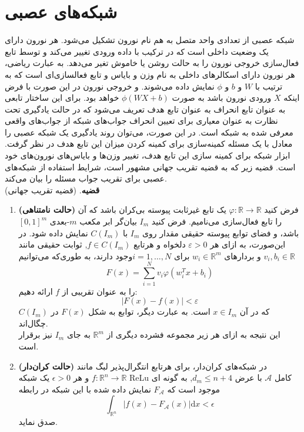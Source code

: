 \section*{شبکه‌های عصبی }
شبکه عصبی از تعدادی واحد متصل به هم نام نورون  تشکیل می‌شود. هر نورون دارای یک وضعیت داخلی است که در ترکیب با داده ورودی تغییر می‌کند و توسط تابع فعال‌سازی خروجی نورون را به حالت روشن یا خاموش تغیر می‌دهد. به عبارت ریاضی، هر نورون دارای اسکالرهای داخلی به نام وزن و بایاس و تابع فعالسازی‌ای است که به ترتیب با $W$ و $b$ و $\phi$ نمایش داده می‌شوند. و خروجی نورون در این صورت با فرض اینکه $X$ ورودی نورون باشد به صورت $\phi(WX + b)$ خواهد بود. برای این ساختار تابعی به عنوان تابع انحراف به عنوان تابع هدف تعریف می‌شود که در حالت یادگیری تحت نظارت به عنوان معیاری برای تعیین انحراف جواب‌های شبکه از جواب‌های واقعی معرفی شده به شبکه است. در این صورت، می‌توان روند یادگیری یک شبکه عصبی را معادل با یک مسئله کمینه‌سازی برای کمینه کردن میزان این تابع هدف در نظر گرفت. ابزار شبکه برای کمینه سازی این تابع هدف، تغییر وزن‌ها و بایاس‌های نورون‌های خود است. قضیه زیر که به قضیه تقریب جهانی مشهور است، شرایط استفاده از شبکه‌های عصبی برای تقریب جواب مسئله را بیان می‌کند.\\
\textbf{قضیه}. (قضیه تقریب جهانی) 
	\begin{enumerate}
	\item \textbf{(حالت نامتناهی)} فرض کنید $\varphi :\mathbb {R} \to \mathbb {R}$ یک تابع غیرثابت پیوسته بی‌کران باشد که آن را تابع فعال‌سازی می‌نامیم. فرض کنید $I_{m}$ بیان‌گر ابر مکعب $m$-بعدی $[0,1]^{m}$ باشد، و فضای توابع پیوسته حقیقی مقدار روی $I_m$ با $C(I_{m})$ نمایش داده شود. در این‌صورت، به ازای هر $\varepsilon > 0$ دلخواه و هرتابع  $f\in C(I_{m})$, ثوابت حقیقی مانند  $v_{i},b_{i}\in \mathbb  {R}$ و بردارهای $w_{i}\in \mathbb {R} ^{m}$ برای $i=1,\dots ,N$وجود دارند، به طوری‌که می‌توانیم  	
	\begin{equation*}
	F(x)=\sum _{{i=1}}^{{N}}v_{i}\varphi \left(w_{i}^{T}x+b_{i}\right)
	\end{equation*}
	را به عنوان تقریبی از $f$ ارائه دهیم:
	\begin{equation*}
	|F(x) - f (x)|  < \varepsilon
	\end{equation*}
	که در آن $x\in I_{m}$ است. به عبارت دیگر، توابع به شکل $F(x)$ در $C(I_{m})$ چگال‌اند.\\
	این نتیجه به ازای هر زیر مجموعه فشرده دیگری از $\mathbb {R} ^{m}$ به جای  $I_m$ نیز برقرار است.
	\item \textbf{(حالت کران‌دار)} در شبکه‌های کران‌دار، برای هرتابع انتگرال‌پذیر لبگ مانند  $f:\mathbb {R} ^{n}\rightarrow \mathbb {R}$ و هر $\epsilon >0$ یک شبکه ReLu کامل $\mathcal {A}$ با عرض $ d_{m}\leq {n+4}$, به گونه ای موجود است که $F_{\mathcal {A}}$ نمایش داده شده با این شبکه در رابطه
	\begin{equation*}
	\int _{\mathbb {R} ^{n}}\left|f(x)-F_{\mathcal {A}}(x)\right|\mathrm {d} x<\epsilon
	\end{equation*}
	صدق ‌نماید.
\end{enumerate}
